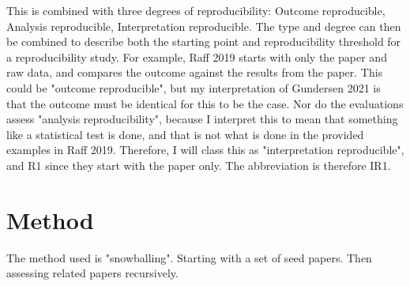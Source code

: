 \documentclass[8pt,a4paper]{article}
\begin{document}
This is combined with three degrees of reproducibility: Outcome reproducible, Analysis reproducible, Interpretation reproducible.
The type and degree can then be combined to describe both the starting point and reproducibility threshold for a reproducibility study.
For example, Raff 2019\cite{raff2019} starts with only the paper and raw data, and compares the outcome against the results from the paper. 
This could be "outcome reproducible", but my interpretation of Gundersen 2021\cite{gundersen2021} 
is that the outcome must be identical for this to be the case. Nor do the evaluations assess "analysis reproducibility", 
because I interpret this to mean that something like a statistical test is done, 
and that is not what is done in the provided examples in Raff 2019\cite{raff2019}.
Therefore, I will class this as "interpretation reproducible", and R1 since they start with the paper only.
The abbreviation is therefore IR1.

\section{Method}
The method used is "snowballing". Starting with a set of seed papers. Then assessing related papers recursively. 
\end{document}

